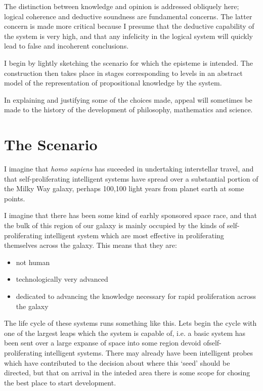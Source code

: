 \documentclass[10pt,titlepage]{article}
\begin{document}
The distinction between knowledge and opinion is addressed obliquely here; logical coherence and deductive soundness are fundamental concerns.
The latter concern is made more critical because I presume that the deductive capability of the system is very high, and that any infelicity in the logical system will quickly lead to false and incoherent conclusions.

I begin by lightly sketching the scenario for which the episteme is intended.
The construction then takes place in stages corresponding to levels in an abstract model of the representation of propositional knowledge by the system.

In explaining and justifying some of the choices made, appeal will sometimes be made to the history of the development of philosophy, mathematics and science.

\section{The Scenario}

I imagine that \emph{homo sapiens} has suceeded in undertaking interstellar travel, and that self-proliferating intelligent systems have spread over a substantial portion of the Milky Way galaxy, perhaps 100,100 light years from planet earth at some points.

I imagine that there has been some kind of earhly sponsored space race, and that the bulk of this region of our galaxy is mainly occupied by the kinds of self-proliferating intelligent system which are most effective in proliferating themselves across the galaxy.
This means that they are:
\begin{itemize}
\item not human
\item technologically very advanced
\item dedicated to advancing the knowledge necessary for rapid proliferation across the galaxy
\end{itemize}

The life cycle of these systems runs something like this.
Lets begin the cycle with one of the largest leaps which the system is capable of, i.e. a basic system has been sent over a large expanse of space into some region devoid ofself-proliferating intelligent systems.
There may already have been intelligent probes which have contributed to the decision about where this `seed' should be directed, but that on arrival in the inteded area there is some scope for chosing the best place to start development.
\end{document}
